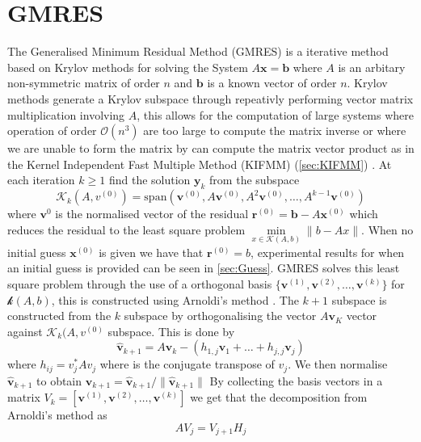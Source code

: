 \appendix
\section{GMRES}\label{appendix:GMRES}

The Generalised Minimum Residual Method (GMRES) \cite{Saad1986GMRES:Systems} is a iterative method based on Krylov methods for solving the System $A\bm{x}=\bm{b}$ where $A$ is an arbitary non-symmetric matrix of order $n$ and $\bm{b}$ is a known vector of order $n$. Krylov methods generate a Krylov subspace through repeativly performing vector matrix multiplication involving $A$, this allows for the computation of large systems where operation of order $\mathcal{O}(n^3)$ are too large to compute the matrix inverse or where we are unable to form the matrix by can compute the matrix vector product as in the Kernel Independent Fast Multiple Method (KIFMM) (\cref{sec:KIFMM}) \cite{Ipsen1998TheMethods}.
At each iteration $k \geq 1$ find the solution $\bm{y}_k$ from the subspace 
\begin{equation*}
    \mathcal{K}_k(A,v^{(0)}) = \text{span}(\bm{v}^{(0)},A\bm{v}^{(0)},A^2\bm{v}^{(0)},\dots,A^{k-1}\bm{v}^{(0)})
\end{equation*}
where $\bm{v}^{0}$ is the normalised vector of the residual $\bm{r}^{(0)}=\bm{b}-A\bm{x}^{(0)}$ which reduces the residual to the least square problem $\min\limits_{x\in\mathcal{K}(A,b)} \lVert b-Ax \rVert$. When no initial guess $\bm{x}^{(0)}$ is given we have that $\bm{r}^{(0)}=b$, experimental results for when an initial guess is provided can be seen in \cref{sec:Guess}. GMRES solves this least square problem through the use of a orthogonal basis $\{\bm{v}^{(1)},\bm{v}^{(2)},\dots,\bm{v}^{(k)}\}$ for $\mathcal{k}(A,b)$, this is constructed using Arnoldi's method \cite{Arnoldi1951TheProblem,Elman2005FiniteDynamics}. The $k+1$ subspace is constructed from the $k$ subspace by orthogonalising the vector $A\bm{v}_K$ vector against $\mathcal{K}_k(A,v^{(0)}$ subspace. This is done by
\begin{equation*}
    \bm{\hat{v}}_{k+1} = A\bm{v}_k - (h_{1,j}\bm{v}_1 + \dots + h_{j,j}\bm{v}_j)
\end{equation*}
where $h_{ij} = v_j^*Av_j$ where is the conjugate transpose of $v_j$. We then normalise $\bm{\hat{v}}_{k+1}$ to obtain $\bm{v}_{k+1}=\bm{\hat{v}}_{k+1}/\lVert \bm{\hat{v}}_{k+1} \rVert$
By collecting the basis vectors in a matrix $V_k = [\bm{v}^{(1)},\bm{v}^{(2)},\dots,\bm{v}^{(k)}]$ we get that the decomposition from Arnoldi's method as
\begin{equation*}
    AV_j = V_{j+1} H_j
\end{equation*}
